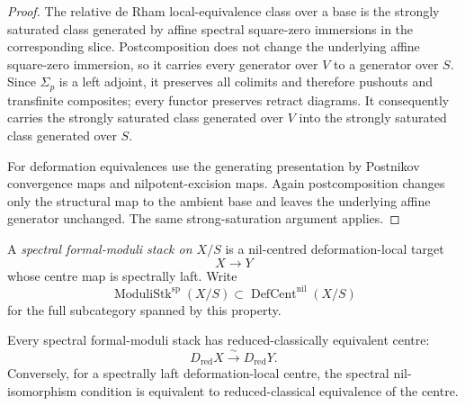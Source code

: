 \begin{proof}
The relative de Rham local-equivalence class over a base is the strongly
saturated class generated by affine spectral square-zero immersions in the
corresponding slice.  Postcomposition does not change the underlying affine
square-zero immersion, so it carries every generator over $V$ to a generator
over $S$.  Since $\Sigma_p$ is a left adjoint, it preserves all colimits and
therefore pushouts and transfinite composites; every functor preserves retract
diagrams.  It consequently carries the strongly saturated class generated over
$V$ into the strongly saturated class generated over $S$.

For deformation equivalences use the generating presentation by Postnikov
convergence maps and nilpotent-excision maps.  Again postcomposition changes
only the structural map to the ambient base and leaves the underlying affine
generator unchanged.  The same strong-saturation argument applies.
\end{proof}

\begin{definition}
\label{def:bnli-formal-moduli-stack}
A \emph{spectral formal-moduli stack on $X/S$} is a nil-centred
deformation-local target
\[
    X\longrightarrow Y
\]
whose centre map is spectrally laft.  Write
\[
\boxed{
    \operatorname{ModuliStk}^{\mathrm{sp}}(X/S)
    \subset
    \operatorname{DefCent}^{\mathrm{nil}}(X/S)}
\]
for the full subcategory spanned by this property.
\end{definition}

\begin{proposition}
\label{prop:bnli-formal-stack-reduced-centre}
Every spectral formal-moduli stack has reduced-classically equivalent centre:
\[
    D_{\mathrm{red}}X
    \xrightarrow{\sim}
    D_{\mathrm{red}}Y.
\]
Conversely, for a spectrally laft deformation-local centre, the spectral
nil-isomorphism condition is equivalent to reduced-classical equivalence of
the centre.
\end{proposition}

